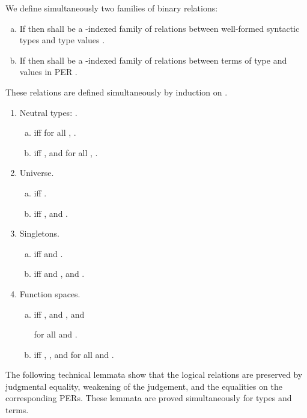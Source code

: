 \documentclass{LMCS}
\begin{document}
\begin{defi}
  \label{def:logrel} We define simultaneously two families of binary
   relations:
  \begin{enumerate}[(a)]
  \item If  then  
    shall be a -indexed family of relations
    between well-formed syntactic types  and type values .
  \item If  then 
    shall be a -indexed family of relations between
    terms  of type  and values  in PER .
  \end{enumerate}
These relations are defined simultaneously by induction on .
  \begin{enumerate}[(1)]
  \item Neutral types: .
    \begin{enumerate}[(a)]
    \item  iff
      for all ,
      .
    \item  iff  , and
      for all ,
      .
    \end{enumerate}
  \item Universe.
    \begin{enumerate}[(a)]
    \item  iff
      .
    \item  iff
      , and .
    \end{enumerate}
  \item Singletons.
    \begin{enumerate}[(a)]
    \item  iff
       and
      .
    \item  iff
       and
      , and
      .
    \end{enumerate}
  \item Function spaces.
    \begin{enumerate}[(a)]
    \item  iff
      , and , and
      
      for all  and
      .
    \item  iff
      , ,
      and  for all
       and
      .
    \end{enumerate}
  \end{enumerate}
\end{defi}\medskip


\noindent The following technical lemmata show that the logical relations are
preserved by judgmental equality, weakening of the judgement, and the
equalities on the corresponding PERs.   These lemmata are proved
simultaneously for types and terms.
\end{document}
